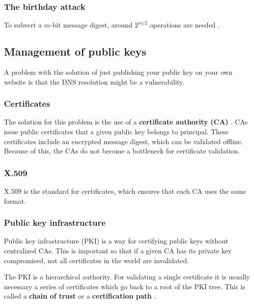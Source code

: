 \subsubsection{The birthday attack}

To subvert a \(m\)-bit message digest, around \(2^{m/2}\) operations are needed \cite[p.~804]{computer-networks-tanenbaum-2012}.

\subsection{Management of public keys}

A problem with the solution of just publishing your public key on your own website is that the DNS resolution might be a vulnerability.

\subsubsection{Certificates}

The solution for this problem is the use of a \textbf{certificate authority (CA)} \cite[p.~807]{computer-networks-tanenbaum-2012}.
CAs issue public certificates that a given public key belongs to principal.
These certificates include an encrypted message digest, which can be validated offline.
Because of this, the CAs do not become a bottleneck for certificate validation.

\subsubsection{X.509}

X.509 is the standard for certificates, which ensures that each CA uses the same format.

\subsubsection{Public key infrastructure}

Public key infrastructure (PKI) is a way for certifying public keys without centralized CAs.
This is important so that if a given CA has its private key compromised, not all certificates in the world are invalidated.

The PKI is a hierarchical authority.
For validating a single certificate it is usually necessary a series of certificates which go back to a root of the PKI tree.
This is called a \textbf{chain of trust} or a \textbf{certification path} \cite[p.~812]{computer-networks-tanenbaum-2012}.

